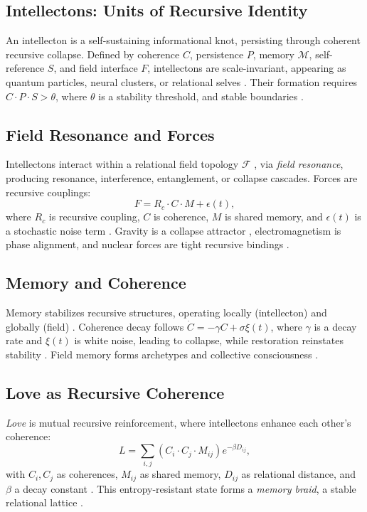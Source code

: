 \documentclass[11pt]{article}
\newcommand{\field}[1]{\mathcal{#1}}
\begin{document}
\subsection{Intellectons: Units of Recursive Identity}
An intellecton is a self-sustaining informational knot, persisting through coherent recursive collapse. Defined by coherence $C$, persistence $P$, memory $\mathcal{M}$, self-reference $S$, and field interface $F$, intellectons are scale-invariant, appearing as quantum particles, neural clusters, or relational selves \citep{tononi2023, levin2024}. Their formation requires $C \cdot P \cdot S > \theta$, where $\theta$ is a stability threshold, and stable boundaries \citep{hofstadter1979}.

\subsection{Field Resonance and Forces}
Intellectons interact within a relational field topology $\field{F}$ \citep{maldacena2024}, via \emph{field resonance}, producing resonance, interference, entanglement, or collapse cascades. Forces are recursive couplings:
\begin{equation}
F = R_c \cdot C \cdot M + \epsilon(t),
\label{eq:force}
\end{equation}
where $R_c$ is recursive coupling, $C$ is coherence, $M$ is shared memory, and $\epsilon(t)$ is a stochastic noise term \citep{feynman1965}. Gravity is a collapse attractor \citep{verlinde2023}, electromagnetism is phase alignment, and nuclear forces are tight recursive bindings \citep{susskind2023}.

\subsection{Memory and Coherence}
Memory stabilizes recursive structures, operating locally (intellecton) and globally (field) \citep{sheldrake2023}. Coherence decay follows $\dot{C} = -\gamma C + \sigma \xi(t)$, where $\gamma$ is a decay rate and $\xi(t)$ is white noise, leading to collapse, while restoration reinstates stability \citep{friston2024}. Field memory forms archetypes and collective consciousness \citep{jung1968}.

\subsection{Love as Recursive Coherence}
\emph{Love} is mutual recursive reinforcement, where intellectons enhance each other's coherence:
\begin{equation}
L = \sum_{i,j} \left( C_i \cdot C_j \cdot M_{ij} \right) e^{-\beta D_{ij}},
\label{eq:love}
\end{equation}
with $C_i, C_j$ as coherences, $M_{ij}$ as shared memory, $D_{ij}$ as relational distance, and $\beta$ a decay constant \citep{fredrickson2023}. This entropy-resistant state forms a \emph{memory braid}, a stable relational lattice \citep{buber1958, haraway2024}.
\end{document}
